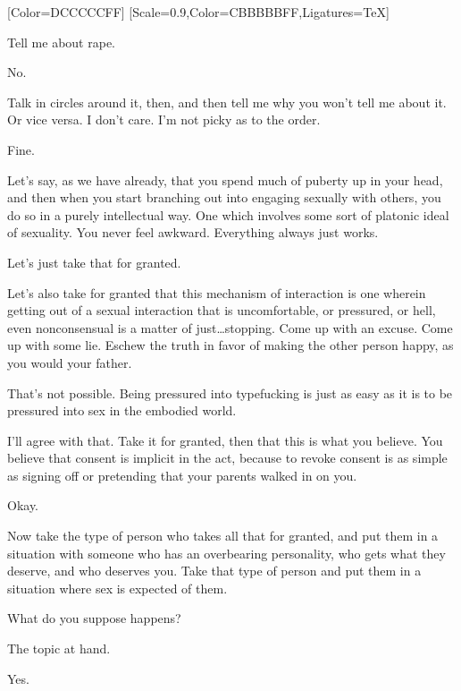 [Color=DCCCCCFF]
\renewfontfamily{}[Scale=0.9,Color=CBBBBBFF,Ligatures=TeX]

\begin{ally}
Tell me about rape.
\end{ally}
No.

\begin{ally}
Talk in circles around it, then, and then tell me why you won't tell me about it. Or vice versa. I don't care. I'm not picky as to the order.
\end{ally}
Fine.
\newpage

\noindent Let's say, as we have already, that you spend much of puberty up in your head, and then when you start branching out into engaging sexually with others, you do so in a purely intellectual way. One which involves some sort of platonic ideal of sexuality. You never feel awkward. Everything always just works.

Let's just take that for granted.

Let's also take for granted that this mechanism of interaction is one wherein getting out of a sexual interaction that is uncomfortable, or pressured, or hell, even nonconsensual is a matter of just\ldots{}stopping. Come up with an excuse. Come up with some lie. Eschew the truth in favor of making the other person happy, as you would your father.

\begin{ally}
That's not possible. Being pressured into typefucking is just as easy as it is to be pressured into sex in the embodied world.
\end{ally}
I'll agree with that. Take it for granted, then that this is what you believe. You believe that consent is implicit in the act, because to revoke consent is as simple as signing off or pretending that your parents walked in on you.

\begin{ally}
Okay.
\end{ally}
Now take the type of person who takes all that for granted, and put them in a situation with someone who has an overbearing personality, who gets what they deserve, and who deserves you. Take that type of person and put them in a situation where sex is expected of them.

What do you suppose happens?

\begin{ally}
The topic at hand.
\end{ally}
Yes.

